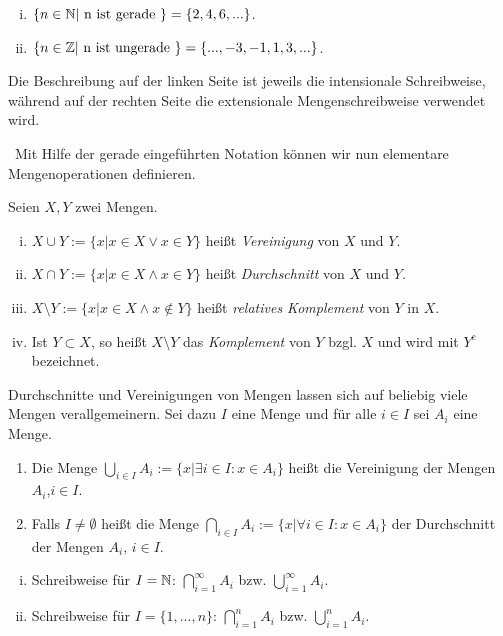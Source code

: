 \begin{example}
    \begin{enumerate}[(i)]
        \item 
        $\{n \in \mathbb{N} | \text{ n ist gerade } \} = \{2,4,6,...\}$. 
        \item 
        $\{n \in \mathbb{Z} | \text{ n ist ungerade } \} = \{...,-3,-1,1,3,...\}$. 
    \end{enumerate}   
    Die Beschreibung auf der linken Seite ist jeweils die intensionale Schreibweise, während auf der rechten Seite die extensionale Mengenschreibweise verwendet wird. 
\end{example}\ 
Mit Hilfe der gerade eingeführten Notation können wir nun elementare Mengenoperationen definieren. 

\begin{mydef}
    Seien $X,Y$ zwei Mengen. 
    \begin{enumerate}[(i)]
        \item  
        $X \cup Y := \{x | x \in X \vee x \in Y\}$ heißt \textit{Vereinigung} von $X$ und $Y$. 
        \item 
        $X \cap Y := \{x | x \in X \wedge x \in Y\}$ heißt \textit{Durchschnitt} von $X$ und $Y$. 
        \item 
        $X \setminus Y := \{x | x \in X \wedge x \notin Y\}$ heißt \textit{relatives Komplement} von $Y$ in $X$. 
        \item 
        Ist $Y \subset X$, so heißt $X \setminus Y$ das \textit{Komplement} von $Y$ bzgl. $X$ und wird mit $Y^c$ bezeichnet. 
    \end{enumerate}
\end{mydef}

\begin{mydef}
    Durchschnitte und Vereinigungen von Mengen lassen sich auf beliebig viele Mengen verallgemeinern. 
    Sei dazu $I$ eine Menge und für alle $i \in I$ sei $A_i$ eine Menge. 
    \begin{enumerate}
        \item 
        Die Menge $\bigcup_{i \in I}A_i := \{x | \exists i \in I: x \in A_i\}$ heißt die Vereinigung der Mengen $A_i$,$i \in I$. 
        \item 
        Falls $I \neq \emptyset$ heißt die Menge $\bigcap_{i \in I}A_i := \{x | \forall i \in I: x \in A_i\}$  der Durchschnitt der Mengen $A_i$, $i \in I$.

    \end{enumerate} 
\end{mydef}

\begin{remark}
    \begin{enumerate}[(i)]
        \item 
        Schreibweise für $I = \mathbb{N}$: $\bigcap_{i=1}^{\infty}A_i$ bzw. $\bigcup_{i=1}^{\infty}A_i$.
        \item 
        Schreibweise für $I = \{1,...,n\}$: $\bigcap_{i=1}^n A_i$ bzw. $\bigcup_{i=1}^n A_i$.
    \end{enumerate}
\end{remark}